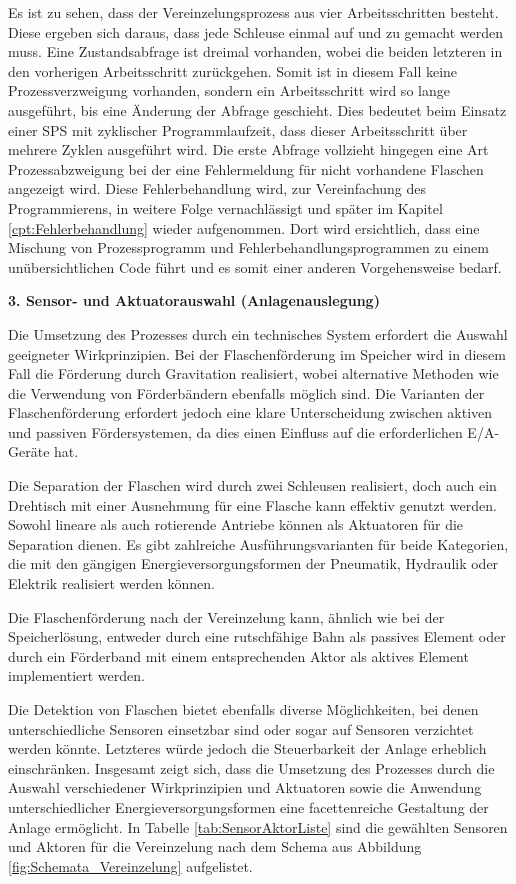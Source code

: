 Es ist zu sehen, dass der Vereinzelungsprozess aus vier Arbeitsschritten besteht. Diese ergeben sich daraus, dass jede Schleuse einmal auf und zu gemacht werden muss. Eine Zustandsabfrage ist dreimal vorhanden, wobei die beiden letzteren in den vorherigen Arbeitsschritt zurückgehen. Somit ist in diesem Fall keine Prozessverzweigung vorhanden, sondern ein Arbeitsschritt wird so lange ausgeführt, bis eine Änderung der Abfrage geschieht. Dies bedeutet beim Einsatz einer SPS mit zyklischer Programmlaufzeit, dass dieser Arbeitsschritt über mehrere Zyklen ausgeführt wird. 
Die erste Abfrage vollzieht hingegen eine Art Prozessabzweigung bei der eine Fehlermeldung für nicht vorhandene Flaschen angezeigt wird. Diese Fehlerbehandlung wird, zur Vereinfachung des Programmierens, in weitere Folge vernachlässigt und später im Kapitel \ref{cpt:Fehlerbehandlung} wieder aufgenommen. Dort wird ersichtlich, dass eine Mischung von Prozessprogramm und Fehlerbehandlungsprogrammen zu einem unübersichtlichen Code führt und es somit einer anderen Vorgehensweise bedarf.  

\textbf{3. Sensor- und Aktuatorauswahl (Anlagenauslegung)}

Die Umsetzung des Prozesses durch ein technisches System erfordert die Auswahl geeigneter Wirkprinzipien. Bei der Flaschenförderung im Speicher wird in diesem Fall die Förderung durch Gravitation realisiert, wobei alternative Methoden wie die Verwendung von Förderbändern ebenfalls möglich sind. Die Varianten der Flaschenförderung erfordert jedoch eine klare Unterscheidung zwischen aktiven und passiven Fördersystemen, da dies einen Einfluss auf die erforderlichen E/A-Geräte hat.

Die Separation der Flaschen wird durch zwei Schleusen realisiert, doch auch ein Drehtisch mit einer Ausnehmung für eine Flasche kann effektiv genutzt werden. Sowohl lineare als auch rotierende Antriebe können als Aktuatoren für die Separation dienen. Es gibt zahlreiche Ausführungsvarianten für beide Kategorien, die mit den gängigen Energieversorgungsformen der Pneumatik, Hydraulik oder Elektrik realisiert werden können.

Die Flaschenförderung nach der Vereinzelung kann, ähnlich wie bei der Speicherlösung, entweder durch eine rutschfähige Bahn als passives Element oder durch ein Förderband mit einem entsprechenden Aktor als aktives Element implementiert werden.

Die Detektion von Flaschen bietet ebenfalls diverse Möglichkeiten, bei denen unterschiedliche Sensoren einsetzbar sind oder sogar auf Sensoren verzichtet werden könnte. Letzteres würde jedoch die Steuerbarkeit der Anlage erheblich einschränken. Insgesamt zeigt sich, dass die Umsetzung des Prozesses durch die Auswahl verschiedener Wirkprinzipien und Aktuatoren sowie die Anwendung unterschiedlicher Energieversorgungsformen eine facettenreiche Gestaltung der Anlage ermöglicht. In Tabelle \ref{tab:SensorAktorListe} sind die gewählten Sensoren und Aktoren für die Vereinzelung nach dem Schema aus Abbildung \ref{fig:Schemata_Vereinzelung} aufgelistet.




